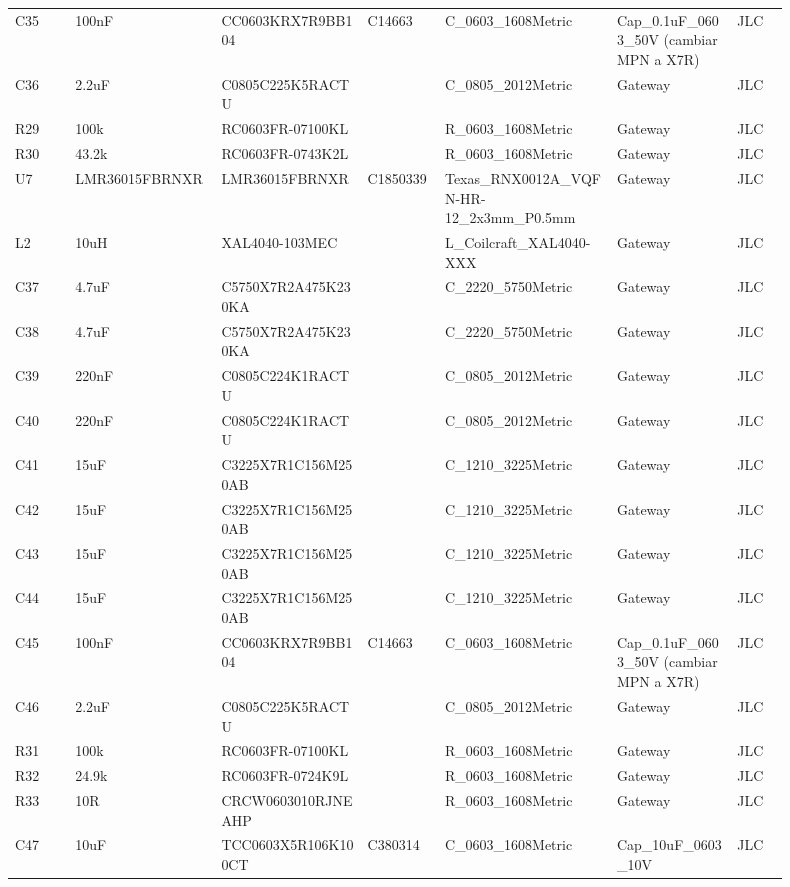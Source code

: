 \documentclass[10pt,a4paper]{article}
\begin{document}
{\begin{longtable}{@{}L{0.07\linewidth}L{0.17\linewidth}L{0.17\linewidth}L{0.09\linewidth}L{0.20\linewidth}L{0.14\linewidth}L{0.06\linewidth}@{}}
C35 & 100nF & CC0603KRX7R9BB104 & C14663 & C\_\allowbreak{}0603\_\allowbreak{}1608Metric & Cap\_\allowbreak{}0.1uF\_\allowbreak{}0603\_\allowbreak{}50V (cambiar MPN a X7R) & JLC\\
C36 & 2.2uF & C0805C225K5RACTU &  & C\_\allowbreak{}0805\_\allowbreak{}2012Metric & Gateway & JLC\\
R29 & 100k & RC0603FR-07100KL &  & R\_\allowbreak{}0603\_\allowbreak{}1608Metric & Gateway & JLC\\
R30 & 43.2k & RC0603FR-0743K2L &  & R\_\allowbreak{}0603\_\allowbreak{}1608Metric & Gateway & JLC\\
U7 & LMR36015FBRNXR & LMR36015FBRNXR & C1850339 & Texas\_\allowbreak{}RNX0012A\_\allowbreak{}VQFN-HR-12\_\allowbreak{}2x3mm\_\allowbreak{}P0.5mm & Gateway & JLC\\
L2 & 10uH & XAL4040-103MEC &  & L\_\allowbreak{}Coilcraft\_\allowbreak{}XAL4040-XXX & Gateway & JLC\\
C37 & 4.7uF & C5750X7R2A475K230KA &  & C\_\allowbreak{}2220\_\allowbreak{}5750Metric & Gateway & JLC\\
C38 & 4.7uF & C5750X7R2A475K230KA &  & C\_\allowbreak{}2220\_\allowbreak{}5750Metric & Gateway & JLC\\
C39 & 220nF & C0805C224K1RACTU &  & C\_\allowbreak{}0805\_\allowbreak{}2012Metric & Gateway & JLC\\
C40 & 220nF & C0805C224K1RACTU &  & C\_\allowbreak{}0805\_\allowbreak{}2012Metric & Gateway & JLC\\
C41 & 15uF & C3225X7R1C156M250AB &  & C\_\allowbreak{}1210\_\allowbreak{}3225Metric & Gateway & JLC\\
C42 & 15uF & C3225X7R1C156M250AB &  & C\_\allowbreak{}1210\_\allowbreak{}3225Metric & Gateway & JLC\\
C43 & 15uF & C3225X7R1C156M250AB &  & C\_\allowbreak{}1210\_\allowbreak{}3225Metric & Gateway & JLC\\
C44 & 15uF & C3225X7R1C156M250AB &  & C\_\allowbreak{}1210\_\allowbreak{}3225Metric & Gateway & JLC\\
C45 & 100nF & CC0603KRX7R9BB104 & C14663 & C\_\allowbreak{}0603\_\allowbreak{}1608Metric & Cap\_\allowbreak{}0.1uF\_\allowbreak{}0603\_\allowbreak{}50V (cambiar MPN a X7R) & JLC\\
C46 & 2.2uF & C0805C225K5RACTU &  & C\_\allowbreak{}0805\_\allowbreak{}2012Metric & Gateway & JLC\\
R31 & 100k & RC0603FR-07100KL &  & R\_\allowbreak{}0603\_\allowbreak{}1608Metric & Gateway & JLC\\
R32 & 24.9k & RC0603FR-0724K9L &  & R\_\allowbreak{}0603\_\allowbreak{}1608Metric & Gateway & JLC\\
R33 & 10R & CRCW0603010RJNEAHP &  & R\_\allowbreak{}0603\_\allowbreak{}1608Metric & Gateway & JLC\\
C47 & 10uF & TCC0603X5R106K100CT & C380314 & C\_\allowbreak{}0603\_\allowbreak{}1608Metric & Cap\_\allowbreak{}10uF\_\allowbreak{}0603\_\allowbreak{}10V & JLC\\
\bottomrule\end{longtable}}
\end{document}
